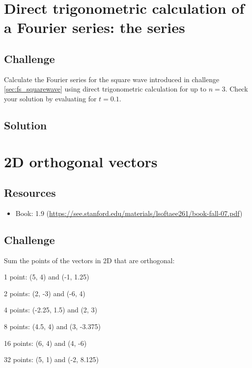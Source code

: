 \newpage
\section{Direct trigonometric calculation of a Fourier series: the series}

\subsection*{Challenge}
Calculate the Fourier series for the square wave introduced in challenge \ref{sec:fs_squarewave} using direct trigonometric calculation for up to $n=3$. Check your solution by evaluating for $t=0.1$.

\subsection*{Solution}
\six{}





\newpage
\section{2D orthogonal vectors}

\subsection*{Resources}
\begin{itemize}
    \item Book: 1.9 (\url{https://see.stanford.edu/materials/lsoftaee261/book-fall-07.pdf})
\end{itemize}

\subsection*{Challenge}
Sum the points of the vectors in 2D that are orthogonal:

1 point: (5, 4) and (-1, 1.25)

2 points:  (2, -3) and (-6, 4)

4 points: (-2.25, 1.5) and (2, 3)

8 points: (4.5, 4) and (3, -3.375)

16 points: (6, 4) and (4, -6)

32 points: (5, 1) and (-2, 8.125)

